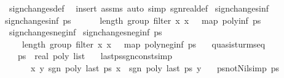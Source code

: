 \begin{isabellebody}
%
\isadelimproof
%
\endisadelimproof
%
\isatagproof
{}\isamarkupfalse%
\ sign{\isacharunderscore}changes{\isacharunderscore}def\ \isamarkupfalse%
\ {\isacharparenleft}insert\ assms{\isacharcomma}\ auto\ simp{\isacharcolon}\ sgn{\isacharunderscore}real{\isacharunderscore}def{\isacharparenright}%
\endisatagproof
{\isafoldproof}%
%
\isadelimproof
\isanewline
%
\endisadelimproof
\isanewline
\isanewline
{}\isamarkupfalse%
\ sign{\isacharunderscore}changes{\isacharunderscore}inf\ \isanewline
{\isachardoublequoteopen}sign{\isacharunderscore}changes{\isacharunderscore}inf\ ps\ {\isacharequal}\ \isanewline
\ \ \ \ length\ {\isacharparenleft}group\ {\isacharparenleft}filter\ {\isacharparenleft}{\isasymlambda}x{\isachardot}\ x\ {\isasymnoteq}\ {}{\isacharparenright}\ {\isacharparenleft}map\ poly{\isacharunderscore}inf\ ps{\isacharparenright}{\isacharparenright}{\isacharparenright}\ {\isacharminus}\ {}{\isachardoublequoteclose}\isanewline
\isanewline
{}\isamarkupfalse%
\ sign{\isacharunderscore}changes{\isacharunderscore}neg{\isacharunderscore}inf\ \isanewline
{\isachardoublequoteopen}sign{\isacharunderscore}changes{\isacharunderscore}neg{\isacharunderscore}inf\ ps\ {\isacharequal}\ \isanewline
\ \ \ \ length\ {\isacharparenleft}group\ {\isacharparenleft}filter\ {\isacharparenleft}{\isasymlambda}x{\isachardot}\ x\ {\isasymnoteq}\ {}{\isacharparenright}\ {\isacharparenleft}map\ poly{\isacharunderscore}neg{\isacharunderscore}inf\ ps{\isacharparenright}{\isacharparenright}{\isacharparenright}\ {\isacharminus}\ {}{\isachardoublequoteclose}%
\isamarkuptrue%
\isamarkupfalse%
\ quasi{\isacharunderscore}sturm{\isacharunderscore}seq\ {\isacharequal}\isanewline
\ \ \ ps\ {\isacharcolon}{\isacharcolon}\ {\isachardoublequoteopen}{\isacharparenleft}real\ poly{\isacharparenright}\ list{\isachardoublequoteclose}\isanewline
\ \ \ last{\isacharunderscore}ps{\isacharunderscore}sgn{\isacharunderscore}const{\isacharbrackleft}simp{\isacharbrackright}{\isacharcolon}\ \isanewline
\ \ \ \ \ \ {\isachardoublequoteopen}{\isasymAnd}x\ y{\isachardot}\ sgn\ {\isacharparenleft}poly\ {\isacharparenleft}last\ ps{\isacharparenright}\ x{\isacharparenright}\ {\isacharequal}\ sgn\ {\isacharparenleft}poly\ {\isacharparenleft}last\ ps{\isacharparenright}\ y{\isacharparenright}{\isachardoublequoteclose}\isanewline
\ \ \ ps{\isacharunderscore}not{\isacharunderscore}Nil{\isacharbrackleft}simp{\isacharbrackright}{\isacharcolon}\ {\isachardoublequoteopen}ps\ {\isasymnoteq}\ {\isacharbrackleft}{\isacharbrackright}{\isachardoublequoteclose}\isanewline

\end{isabellebody}
